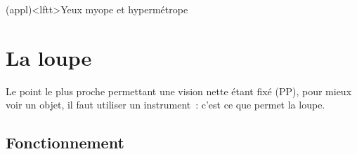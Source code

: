 \documentclass[../../main/main.tex]{subfiles}
\begin{document}
\begin{tcb*}(appl)<lftt>{Yeux myope et hypermétrope}
	\begin{center}
	\end{center}
	\begin{center}
	\end{center}
\end{tcb*}

\section{La loupe}
Le point le plus proche permettant une vision nette étant fixé (PP), pour mieux
voir un objet, il faut utiliser un instrument~: c'est ce que permet la loupe.

\subsection{Fonctionnement}
\end{document}
